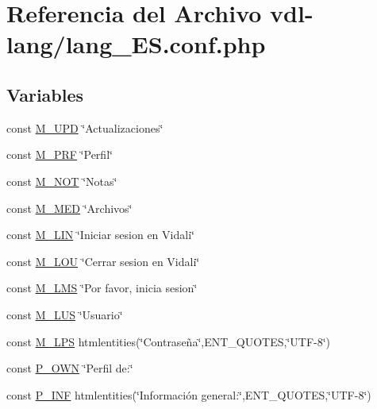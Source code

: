 \hypertarget{lang__ES_8conf_8php}{\section{Referencia del Archivo vdl-\/lang/lang\-\_\-\-E\-S.conf.\-php}
\label{lang__ES_8conf_8php}
}
\subsection*{Variables}
\begin{DoxyCompactItemize}
\item 
const \hyperlink{lang__ES_8conf_8php_aa05f4b68a1c61dd74d97c3a7c79f1efd}{M\-\_\-\-U\-P\-D} \char`\"{}Actualizaciones\char`\"{}
\item 
const \hyperlink{lang__ES_8conf_8php_acc375524bbf44b4d19de33e33c37b987}{M\-\_\-\-P\-R\-F} \char`\"{}Perfil\char`\"{}
\item 
const \hyperlink{lang__ES_8conf_8php_a54125c8fde2d02736eb378419d0c5e07}{M\-\_\-\-N\-O\-T} \char`\"{}Notas\char`\"{}
\item 
const \hyperlink{lang__ES_8conf_8php_a8f62983a225a0e2c9e4c149d53adef1d}{M\-\_\-\-M\-E\-D} \char`\"{}Archivos\char`\"{}
\item 
const \hyperlink{lang__ES_8conf_8php_aba49d79918f2da98a19ce1e73d674f95}{M\-\_\-\-L\-I\-N} \char`\"{}Iniciar sesion en Vidali\char`\"{}
\item 
const \hyperlink{lang__ES_8conf_8php_ab6a2c194e700c706f8e86e099778d4e8}{M\-\_\-\-L\-O\-U} \char`\"{}Cerrar sesion en Vidali\char`\"{}
\item 
const \hyperlink{lang__ES_8conf_8php_af8bb8e5d1a085e8f984f8c811717122b}{M\-\_\-\-L\-M\-S} \char`\"{}Por favor, inicia sesion\char`\"{}
\item 
const \hyperlink{lang__ES_8conf_8php_aa430cdb4e357c20e4c15429ebae6c5bb}{M\-\_\-\-L\-U\-S} \char`\"{}Usuario\char`\"{}
\item 
const \hyperlink{lang__ES_8conf_8php_a762ae5a0e2c725142d056d0c161e4b4e}{M\-\_\-\-L\-P\-S} htmlentities(\char`\"{}Contraseña\char`\"{},E\-N\-T\-\_\-\-Q\-U\-O\-T\-E\-S,\char`\"{}U\-T\-F-\/8\char`\"{})
\item 
const \hyperlink{lang__ES_8conf_8php_ac1d527ffba12018124c595f2ad74c851}{P\-\_\-\-O\-W\-N} \char`\"{}Perfil de\-:\char`\"{}
\item 
const \hyperlink{lang__ES_8conf_8php_a31d1da665267d377fc62572b9b2e09fa}{P\-\_\-\-I\-N\-F} htmlentities(\char`\"{}Información general\-:\char`\"{},E\-N\-T\-\_\-\-Q\-U\-O\-T\-E\-S,\char`\"{}U\-T\-F-\/8\char`\"{})

\end{DoxyCompactItemize}
